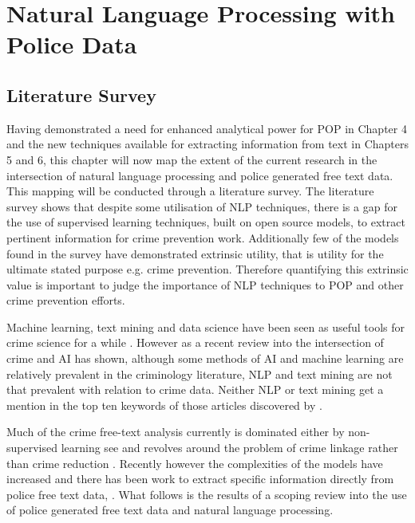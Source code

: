 \chapter{ Natural Language Processing with Police Data}

\section{Literature Survey}

Having demonstrated a need for enhanced analytical power for POP in Chapter 4 and the new techniques available for extracting information from text in Chapters 5 and 6, this chapter will now map the extent of the current research in the intersection of natural language processing and police generated free text data. This mapping will be conducted through a literature survey. The literature survey shows that despite some utilisation of NLP techniques, there is a gap for the use of supervised learning techniques, built on open source models, to extract pertinent information for crime prevention work. Additionally few of the models found in the survey have demonstrated extrinsic utility, that is utility for the ultimate stated purpose e.g. crime prevention.  Therefore quantifying this extrinsic value is important to judge the importance of NLP techniques to POP and other crime prevention efforts.

Machine learning, text mining and data science have been seen as useful tools for crime science for a while \parencite{marshall2006needles}. However as a recent review into the intersection of crime and AI has shown\parencite{campedelli2019we}, although some methods of AI and machine learning are relatively prevalent in the criminology  literature, NLP and text mining are not that prevalent with relation to crime data. Neither NLP or text mining  get a mention in the top ten keywords of those articles discovered by \textcite{campedelli2019we}. 

Much of the crime free-text analysis currently is dominated either by non-supervised learning see \parencite{kuang2017crime, seo2018partially, birks2020unsupervised} and revolves around the problem of crime linkage rather than crime reduction \parencite{hassani2016review}. Recently however the complexities of the models have increased and there has been work to extract specific information directly from police free text data, \parencite{karystianis2018automatic, karystianis2019automated}.  What follows is the results of a scoping review \parencite{arksey2005scoping} into the use of police generated free text data and natural language processing. 

